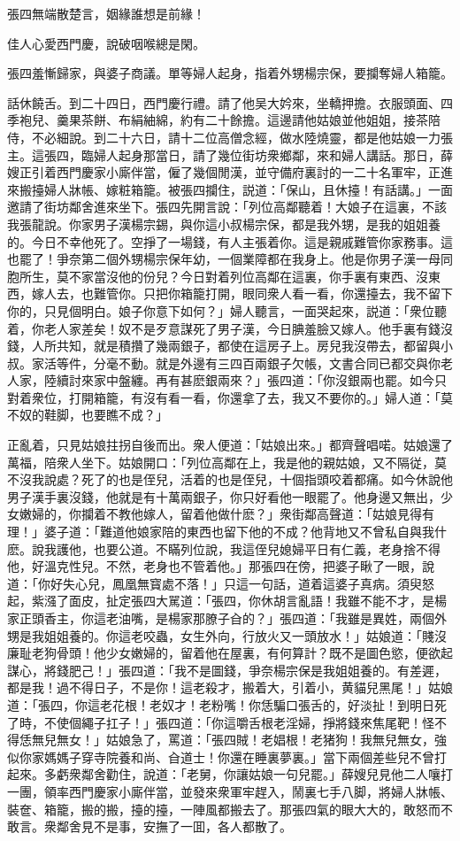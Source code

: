 張四無端散楚言，姻緣誰想是前緣！

佳人心愛西門慶，說破咽喉總是閑。

張四羞慚歸家，與婆子商議。單等婦人起身，指着外甥楊宗保，要攔奪婦人箱籠。

話休饒舌。到二十四日，西門慶行禮。請了他吴大妗來，坐轎押擔。衣服頭面、四季袍兒、羹果茶餅、布絹紬綿，約有二十餘擔。這邊請他姑娘並他姐姐，接茶陪侍，不必細說。到二十六日，請十二位高僧念經，做水陸燒靈，都是他姑娘一力張主。這張四，臨婦人起身那當日，請了幾位街坊衆鄉鄰，來和婦人講話。那日，薛嫂正引着西門慶家小廝伴當，僱了幾個閒漢，並守備府裏討的一二十名軍牢，正進來搬擡婦人牀帳、嫁粧箱籠。被張四攔住，説道：「保山，且休擡！有話講。」一面邀請了街坊鄰舍進來坐下。張四先開言說：「列位高鄰聽着！大娘子在這裏，不該我張龍說。你家男子漢楊宗錫，與你這小叔楊宗保，都是我外甥，是我的姐姐養的。今日不幸他死了。空掙了一場錢，有人主張着你。這是親戚難管你家務事。這也罷了！爭奈第二個外甥楊宗保年幼，一個業障都在我身上。他是你男子漢一母同胞所生，莫不家當沒他的份兒？今日對着列位高鄰在這裏，你手裏有東西、沒東西，嫁人去，也難管你。只把你箱籠打開，眼同衆人看一看，你還擡去，我不留下你的，只見個明白。娘子你意下如何？」婦人聽言，一面哭起來，説道：「衆位聽着，你老人家差矣！奴不是歹意謀死了男子漢，今日腆羞臉又嫁人。他手裏有錢沒錢，人所共知，就是積攢了幾兩銀子，都使在這房子上。房兒我沒帶去，都留與小叔。家活等件，分毫不動。就是外邊有三四百兩銀子欠帳，文書合同已都交與你老人家，陸續討來家中盤纏。再有甚麽銀兩來？」張四道：「你沒銀兩也罷。如今只對着衆位，打開箱籠，有沒有看一看，你還拿了去，我又不要你的。」婦人道：「莫不奴的鞋脚，也要瞧不成？」

正亂着，只見姑娘拄拐自後而出。衆人便道：「姑娘出來。」都齊聲唱喏。姑娘還了萬福，陪衆人坐下。姑娘開口：「列位高鄰在上，我是他的親姑娘，又不隔従，莫不沒我說處？死了的也是侄兒，活着的也是侄兒，十個指頭咬着都痛。如今休說他男子漢手裏沒錢，他就是有十萬兩銀子，你只好看他一眼罷了。他身邊又無出，少女嫩婦的，你攔着不教他嫁人，留着他做什麽？」衆街鄰高聲道：「姑娘見得有理！」婆子道：「難道他娘家陪的東西也留下他的不成？他背地又不曾私自與我什麽。說我護他，也要公道。不瞞列位說，我這侄兒媳婦平日有仁義，老身捨不得他，好溫克性兒。不然，老身也不管着他。」那張四在傍，把婆子瞅了一眼，說道：「你好失心兒，鳳凰無寳處不落！」只這一句話，道着這婆子真病。須臾怒起，紫漒了面皮，扯定張四大駡道：「張四，你休胡言亂語！我雖不能不才，是楊家正頭香主，你這老油嘴，是楊家那膫子㒲的？」張四道：「我雖是異姓，兩個外甥是我姐姐養的。你這老咬蟲，女生外向，行放火又一頭放水！」姑娘道：「賤沒廉耻老狗骨頭！他少女嫩婦的，留着他在屋裏，有何算計？既不是圖色慾，便欲起謀心，將錢肥己！」張四道：「我不是圖錢，爭奈楊宗保是我姐姐養的。有差遲，都是我！過不得日子，不是你！這老殺才，搬着大，引着小，黄貓兒黑尾！」姑娘道：「張四，你這老花根！老奴才！老粉嘴！你恁騙口張舌的，好淡扯！到明日死了時，不使個繩子扛子！」張四道：「你這嚼舌根老淫婦，掙將錢來焦尾靶！怪不得恁無兒無女！」姑娘急了，罵道：「張四賊！老娼根！老猪狗！我無兒無女，強似你家媽媽子穿寺院養和尚、㒲道士！你還在睡裏夢裏。」當下兩個差些兒不曾打起來。多虧衆鄰舍勸住，說道：「老舅，你讓姑娘一句兒罷。」薛嫂兒見他二人嚷打一團，領率西門慶家小廝伴當，並發來衆軍牢趕入，鬧裏七手八脚，將婦人牀帳、裝奩、箱籠，搬的搬，擡的擡，一陣風都搬去了。那張四氣的眼大大的，敢怒而不敢言。衆鄰舍見不是事，安撫了一囬，各人都散了。

